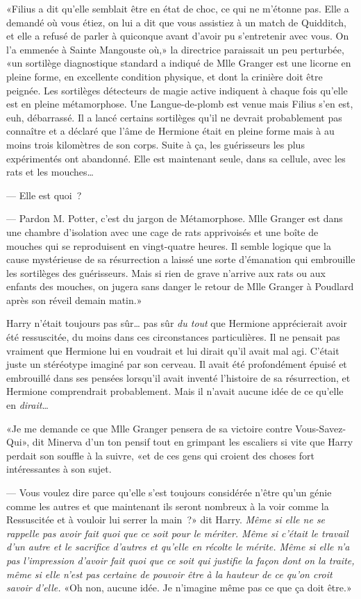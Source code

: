 «Filius a dit qu'elle semblait être en état de choc, ce qui ne m'étonne pas. Elle a demandé où vous étiez, on lui a dit que vous assistiez à un match de Quidditch, et elle a refusé de parler à quiconque avant d'avoir pu s'entretenir avec vous. On l'a emmenée à Sainte Mangouste où,» la directrice paraissait un peu perturbée, «un sortilège diagnostique standard a indiqué de Mlle Granger est une licorne en pleine forme, en excellente condition physique, et dont la crinière doit être peignée. Les sortilèges détecteurs de magie active indiquent à chaque fois qu'elle est en pleine métamorphose. Une Langue-de-plomb est venue mais Filius s'en est, euh, débarrassé. Il a lancé certains sortilèges qu'il ne devrait probablement pas connaître et a déclaré que l'âme de Hermione était en pleine forme mais à au moins trois kilomètres de son corps. Suite à ça, les guérisseurs les plus expérimentés ont abandonné. Elle est maintenant seule, dans sa cellule, avec les rats et les mouches…

--- Elle est quoi~?

--- Pardon M. Potter, c'est du jargon de Métamorphose. Mlle Granger est dans une chambre d'isolation avec une cage de rats apprivoisés et une boîte de mouches qui se reproduisent en vingt-quatre heures. Il semble logique que la cause mystérieuse de sa résurrection a laissé une sorte d'émanation qui embrouille les sortilèges des guérisseurs. Mais si rien de grave n'arrive aux rats ou aux enfants des mouches, on jugera sans danger le retour de Mlle Granger à Poudlard après son réveil demain matin.»

Harry n'était toujours pas sûr… pas sûr \emph{du tout} que Hermione apprécierait avoir été ressuscitée, du moins dans ces circonstances particulières. Il ne pensait pas vraiment que Hermione lui en voudrait et lui dirait qu'il avait mal agi. C'était juste un stéréotype imaginé par son cerveau. Il avait été profondément épuisé et embrouillé dans ses pensées lorsqu'il avait inventé l'histoire de sa résurrection, et Hermione comprendrait probablement. Mais il n'avait aucune idée de ce qu'elle en \emph{dirait}…

«Je me demande ce que Mlle Granger pensera de sa victoire contre Vous-Savez-Qui», dit Minerva d'un ton pensif tout en grimpant les escaliers si vite que Harry perdait son souffle à la suivre, «et de ces gens qui croient des choses fort intéressantes à son sujet.

--- Vous voulez dire parce qu'elle s'est toujours considérée n'être qu'un génie comme les autres et que maintenant ils seront nombreux à la voir comme la Ressuscitée et à vouloir lui serrer la main~?» dit Harry. \emph{Même si elle ne se rappelle pas avoir fait quoi que ce soit pour le mériter. Même si c'était le travail d'un autre et le sacrifice d'autres et qu'elle en récolte le mérite. Même si elle n'a pas l'impression d'avoir fait quoi que ce soit qui justifie la façon dont on la traite, même si elle n'est pas certaine de pouvoir être à la hauteur de ce qu'on croit savoir d'elle.} «Oh non, aucune idée. Je n'imagine même pas ce que ça doit être.»

